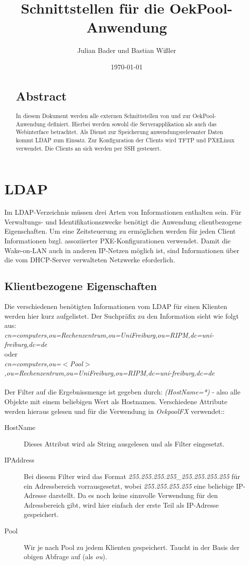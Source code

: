 \documentclass[	
				a4paper, 
				twoside,
				11pt,
				DIV11,
				BCOR12mm,
				bibtotoc, 
				halfparskip, 
				headsepline, 
				pointlessnumbers]{scrartcl}
\title{Schnittstellen für die OekPool-Anwendung}
\author{Julian Bader und Bastian Wißler}
\date{\today}
\begin{document}
\maketitle
\indent
\begin{abstract}
\section*{Abstract}
In diesem Dokument werden alle externen Schnittstellen von und zur OekPool-Anwendung definiert.
Hierbei werden sowohl die Serverapplikation als auch das Webinterface betrachtet.
Als Dienst zur Speicherung anwendungsrelevanter Daten kommt LDAP zum Einsatz.
Zur Konfiguration der Clients wird TFTP und PXELinux verwendet.
Die Clients an sich werden per SSH gesteuert.
\end{abstract}
\newpage

\section{LDAP}
Im LDAP-Verzeichnis müssen drei Arten von Informationen enthalten sein.
Für Verwaltungs- und Identifikationszwecke benötigt die Anwendung clientbezogene Eigenschaften.
Um eine Zeitsteuerung zu ermöglichen werden für jeden Client Informationen bzgl. assoziierter PXE-Konfigurationen verwendet.
Damit die Wake-on-LAN auch in anderen IP-Netzen möglich ist, sind Informationen über die vom DHCP-Server verwalteten Netzwerke eforderlich.

\subsection{Klientbezogene Eigenschaften}
Die verschiedenen benötigten Informationen vom LDAP für einen Klienten werden hier kurz aufgelistet. Der Suchpräfix zu den Information sieht wie folgt aus: \\ \textit{cn=computers,ou=Rechenzentrum,ou=UniFreiburg,ou=RIPM,dc=uni-freiburg,dc=de} \\
oder \\
\textit{cn=computers,ou=$<$Pool$>$,ou=Rechenzentrum,ou=UniFreiburg,ou=RIPM,dc=uni-freiburg,dc=de} \\ \\
Der Filter auf die Ergebnissmenge ist gegeben durch: \textit{(HostName=*)} - also alle Objekte mit einem beliebigen Wert als Hostnamen. Verschiedene Attribute werden hieraus gelesen und für die Verwendung in \textit{OekpoolFX} verwendet::
\begin{description}
\item[HostName] Dieses Attribut wird als String ausgelesen und als Filter eingesetzt.
\item[IPAddress] Bei diesem Filter wird das Format \textit{255.255.255.255\_255.255.255.255} für ein Adressbereich vorrausgesetzt, wobei \textit{255.255.255.255} eine beliebige IP-Adresse darstellt. Da es noch keine sinnvolle Verwendung für den Adressbereich gibt, wird hier einfach der erste Teil als IP-Adresse gespeichert.
\item[Pool] Wir je nach Pool zu jedem Klienten gespeichert. Taucht in der Basis der obigen Abfrage auf (als \textit{ou}).
\end{description}
\end{document}
